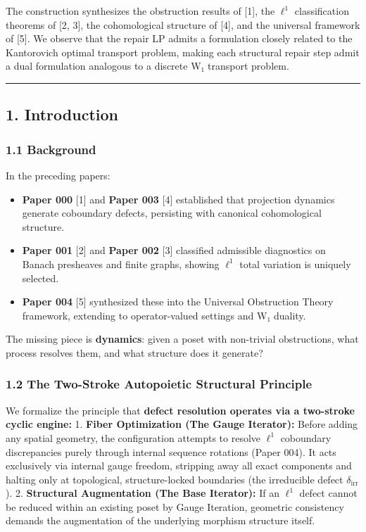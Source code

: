 \documentclass[
]{article}
\providecommand{\tightlist}{%
  \setlength{\itemsep}{0pt}\setlength{\parskip}{0pt}}
\begin{document}
The construction synthesizes the obstruction results of {[}1{]}, the
\(\ell^1\) classification theorems of {[}2, 3{]}, the cohomological
structure of {[}4{]}, and the universal framework of {[}5{]}. We observe
that the repair LP admits a formulation closely related to the
Kantorovich optimal transport problem, making each structural repair
step admit a dual formulation analogous to a discrete W₁ transport
problem.

\begin{center}\rule{0.5\linewidth}{0.5pt}\end{center}

\subsection{1. Introduction}\label{introduction}

\subsubsection{1.1 Background}\label{background}

In the preceding papers:

\begin{itemize}
\tightlist
\item
  \textbf{Paper 000} {[}1{]} and \textbf{Paper 003} {[}4{]} established
  that projection dynamics generate coboundary defects, persisting with
  canonical cohomological structure.
\item
  \textbf{Paper 001} {[}2{]} and \textbf{Paper 002} {[}3{]} classified
  admissible diagnostics on Banach presheaves and finite graphs, showing
  \(\ell^1\) total variation is uniquely selected.
\item
  \textbf{Paper 004} {[}5{]} synthesized these into the Universal
  Obstruction Theory framework, extending to operator-valued settings
  and W₁ duality.
\end{itemize}

The missing piece is \textbf{dynamics}: given a poset with non-trivial
obstructions, what process resolves them, and what structure does it
generate?

\subsubsection{1.2 The Two-Stroke Autopoietic Structural
Principle}\label{the-two-stroke-autopoietic-structural-principle}

We formalize the principle that \textbf{defect resolution operates via a
two-stroke cyclic engine:} 1. \textbf{Fiber Optimization (The Gauge
Iterator):} Before adding any spatial geometry, the configuration
attempts to resolve \(\ell^1\) coboundary discrepancies purely through
internal sequence rotations (Paper 004). It acts exclusively via
internal gauge freedom, stripping away all exact components and halting
only at topological, structure-locked boundaries (the irreducible defect
\(\delta_{\text{irr}}\)). 2. \textbf{Structural Augmentation (The Base
Iterator):} If an \(\ell^1\) defect cannot be reduced within an existing
poset by Gauge Iteration, geometric consistency demands the augmentation
of the underlying morphism structure itself.
\end{document}
